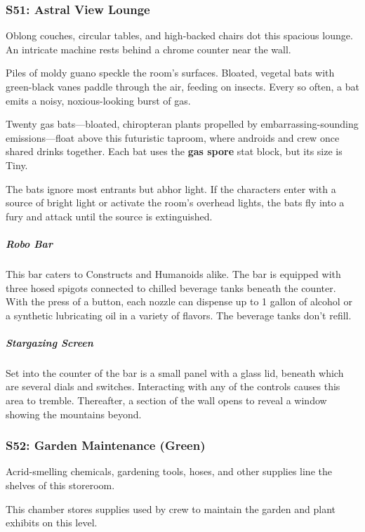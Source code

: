 \documentclass[10pt,a4paper,twoside,bg=print,twocolumn,openany,nodeprecatedcode]{dndbook}
\begin{document}
\subsubsection{S51: Astral View Lounge}
\begin{DndReadAloud}{}
Oblong couches, circular tables, and high-backed chairs dot this spacious lounge. An intricate machine rests behind a chrome counter near the wall.

Piles of moldy guano speckle the room's surfaces. Bloated, vegetal bats with green-black vanes paddle through the air, feeding on insects. Every so often, a bat emits a noisy, noxious-looking burst of gas.

\end{DndReadAloud}

Twenty gas bats—bloated, chiropteran plants propelled by embarrassing-sounding emissions—float above this futuristic taproom, where androids and crew once shared drinks together. Each bat uses the \textbf{gas spore} stat block, but its size is Tiny.

The bats ignore most entrants but abhor light. If the characters enter with a source of bright light or activate the room's overhead lights, the bats fly into a fury and attack until the source is extinguished.

\subparagraph{Robo Bar}
This bar caters to Constructs and Humanoids alike. The bar is equipped with three hosed spigots connected to chilled beverage tanks beneath the counter. With the press of a button, each nozzle can dispense up to 1 gallon of alcohol or a synthetic lubricating oil in a variety of flavors. The beverage tanks don't refill.

\subparagraph{Stargazing Screen}
Set into the counter of the bar is a small panel with a glass lid, beneath which are several dials and switches. Interacting with any of the controls causes this area to tremble. Thereafter, a section of the wall opens to reveal a window showing the mountains beyond.

\subsubsection{S52: Garden Maintenance (Green)}
\begin{DndReadAloud}{}
Acrid-smelling chemicals, gardening tools, hoses, and other supplies line the shelves of this storeroom.

\end{DndReadAloud}

This chamber stores supplies used by crew to maintain the garden and plant exhibits on this level.
\end{document}
